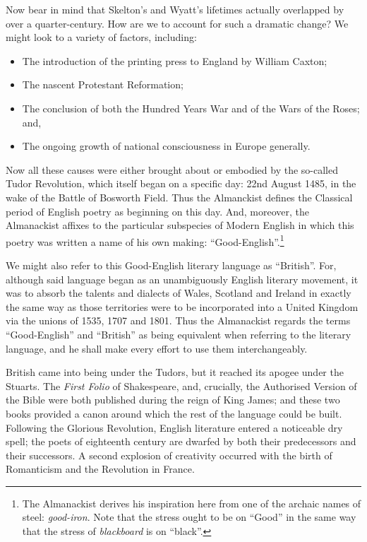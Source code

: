 \documentclass[0main.tex]{subfiles}
\begin{document}
\bigskip

Now bear in mind that Skelton's and Wyatt's lifetimes actually overlapped by over a quarter-century. How are we to account for such a dramatic change? We might look to a variety of factors, including:

\bigskip

\begin{itemize}
\item{The introduction of the printing press to England by William Caxton;}
\item{The nascent Protestant Reformation;}
\item{The conclusion of both the Hundred Years War and of the Wars of the Roses; and,}
\item{The ongoing growth of national consciousness in Europe generally.}
\end{itemize}

\bigskip

Now all these causes were either brought about or embodied by the so-called Tudor Revolution, which itself began on a specific day: 22nd August 1485, in the wake of the Battle of Bosworth Field. Thus the Almanckist defines the Classical period of English poetry as beginning on this day. And, moreover, the Almanackist affixes to the particular subspecies of Modern English in which this poetry was written a name of his own making: ``Good-English''.\footnote{The Almanackist derives his inspiration here from one of the archaic names of steel: \emph{good-iron}. Note that the stress ought to be on ``Good'' in the same way that the stress of \emph{blackboard} is on ``black''.}

We might also refer to this Good-English literary language as ``British''. For, although said language began as an unambiguously English literary movement, it was to absorb the talents and dialects of Wales, Scotland and Ireland in exactly the same way as those territories were to be incorporated into a United Kingdom via the unions of 1535, 1707 and 1801. Thus the Almanackist regards the terms ``Good-English'' and ``British'' as being equivalent when referring to the literary language, and he shall make every effort to use them interchangeably.

British came into being under the Tudors, but it reached its apogee under the Stuarts. The \emph{First Folio} of Shakespeare, and, crucially, the Authorised Version of the Bible were both published during the reign of King James; and these two books provided a canon around which the rest of the language could be built. Following the Glorious Revolution, English literature entered a noticeable dry spell; the poets of eighteenth century are dwarfed by both their predecessors and their successors. A second explosion of creativity occurred with the birth of Romanticism and the Revolution in France.
\end{document}
